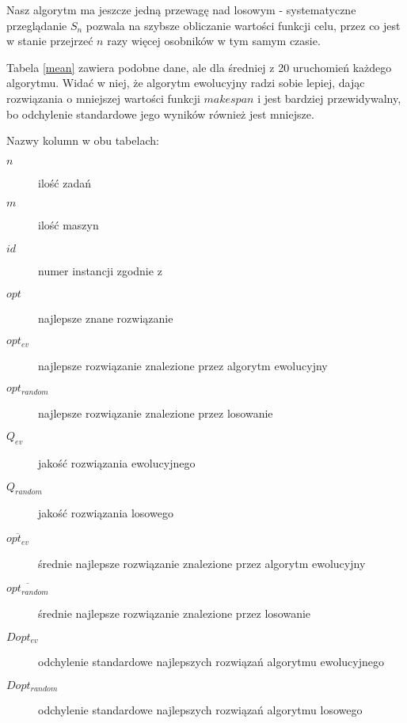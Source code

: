 \documentclass[11pt, a4wide]{article}
\begin{document}
Nasz algorytm ma jeszcze jedną przewagę nad losowym - systematyczne
przeglądanie $S_n$ pozwala na szybsze obliczanie wartości funkcji celu, przez
co jest w stanie przejrzeć $n$ razy więcej osobników w tym samym czasie.

Tabela \ref{mean} zawiera podobne dane, ale dla średniej z 20 uruchomień każdego
algorytmu. Widać w niej, że algorytm ewolucyjny radzi sobie lepiej, dając rozwiązania
o mniejszej wartości funkcji $makespan$ i jest bardziej przewidywalny, bo odchylenie
standardowe jego wyników również jest mniejsze.

Nazwy kolumn w obu tabelach:
\begin{description}
  \item[$n$] ilość zadań 
  \item[$m$] ilość maszyn 
  \item[$id$] numer instancji zgodnie z \cite{inst}
  \item[$opt$] najlepsze znane rozwiązanie
  \item[$opt_{ev}$] najlepsze rozwiązanie znalezione przez algorytm ewolucyjny
  \item[$opt_{random}$] najlepsze rozwiązanie znalezione przez losowanie
  \item[$Q_{ev}$] jakość rozwiązania ewolucyjnego 
  \item[$Q_{random}$] jakość rozwiązania losowego

  \item[$\overline{opt_{ev}}$] średnie najlepsze rozwiązanie znalezione przez algorytm ewolucyjny
  \item[$\overline{opt_{random}}$] średnie najlepsze rozwiązanie znalezione przez losowanie
  \item[$Dopt_{ev}$] odchylenie standardowe najlepszych rozwiązań algorytmu ewolucyjnego
  \item[$Dopt_{random}$] odchylenie standardowe najlepszych rozwiązań algorytmu losowego
\end{description}
\end{document}
